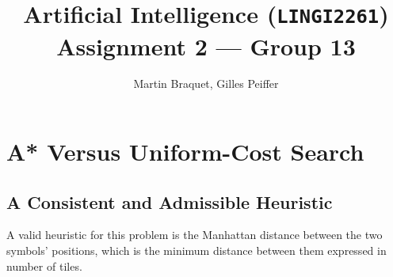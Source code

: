 \documentclass[journal]{IEEEtran}
\title{Artificial Intelligence (\texttt{LINGI2261}) \\ Assignment 2 --- Group 13}
\author{Martin Braquet, Gilles Peiffer}
\begin{document}
\maketitle

\section{A* Versus Uniform-Cost Search}

\subsection{A Consistent and Admissible Heuristic}

A valid heuristic for this problem is the Manhattan distance between the two symbols' positions, which is the minimum distance between them expressed in number of tiles.
\end{document}
